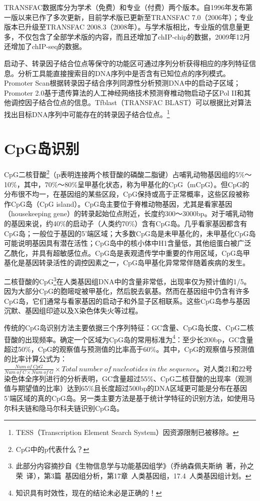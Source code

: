 \documentclass[11pt,a4paper,twoside]{book}
\begin{document}
TRANSFAC数据库分为学术（免费）和专业（付费）两个版本。自1996年发布第一版以来已作了多次更新，目前学术版已更新至TRANSFAC 7.0（2006年）；专业版本已升级至TRANSFAC 2008.3（2008年）。与学术版相比，专业版的信息量更多，不仅包含了全部学术版的内容，而且还增加了chIP-chip的数据，2009年12月还增加了chIP-seq的数据。

启动子、转录因子结合位点等保守的功能区可通过序列分析获得相应的序列特征信息。分析工具能直接搜索目的DNA序列中是否含有已知位点的序列模式。Promoter Scan根据转录因子结合序列同源性分析预测DNA中的启动子区域；Promoter 2.0基于遗传算法的人工神经网络技术预测脊椎动物启动子区Pol II和其他调控因子结合位点的信息。Tfblast（TRANSFAC BLAST）可以根据比对算法找出目标DNA序列中可能存在的转录因子结合位点。\footnote{TESS（Transcription Element Search System）因资源限制已被移除。}

\section{CpG岛识别}
CpG二核苷酸\footnote{CpG中的p代表什么？}（p表明连接两个核苷酸的磷酸二脂键）占哺乳动物基因组的5\%～10\%，其中，70\%～80\%呈甲基化状态，称为甲基化的CpG（mCpG）。但CpG的分布很不均一，在基因组的某些区段，CpG保持或高于正常概率，这些区段被称作CpG岛（CpG island）。CpG岛主要位于脊椎动物基因，尤其是看家基因（housekeeping gene）的转录起始位点附近，长度约300～3000bp。对于哺乳动物的基因来说，约40\%的启动子（人类约70\%）含有CpG岛。几乎看家基因都含有CpG岛；一般位于基因的5'端区域；大多数CpG岛是未甲基化的，未甲基化CpG岛可能说明基因具有潜在活性；CpG岛中的核小体中H1含量低，其他组蛋白被广泛乙酰化，并具有超敏感位点。CpG岛是表观遗传学中重要的作用区域，CpG岛甲基化是基因转录活性的调控因素之一，CpG岛甲基化异常常伴随着疾病的发生。

二核苷酸的CpG\footnote{此部分内容摘抄自《生物信息学与功能基因组学》（乔纳森\textbullet 佩夫斯纳\ 著，孙之荣\ 译），第3篇\ 基因组分析，第17章\ 人类基因组，17.4\ 人类基因组计划。}在人类基因组DNA中的含量非常低，出现率仅为预计值的1/5。因为大部分CpG的胞嘧啶被甲基化，然后脱去氨基。然而在基因组中仍含有许多CpG岛，它们通常与看家基因的启动子和外显子区相联系。这些CpG岛参与基因沉默、基因组印迹以及X染色体失火等过程。

传统的CpG岛识别方法主要依据三个序列特征：GC含量、CpG岛长度、CpG二核苷酸的出现频率。确定一个区域为CpG岛的常用标准为\footnote{知识具有时效性，现在的结论未必是正确的！}：至少长200bp，GC含量超过50\%，CpG的观察值与预测值的比率高于60\%。其中，CpG的观察值与预测值的比率计算公式为：$\frac{Num\ of\ CpG}{Num\ of\ C \times Num\ of\ G} \times Total\ number\ of\ nucleotides\ in\ the\ sequence$。对人类21和22号染色体全序列进行的分析表明，GC含量超过55\%、CpG二核苷酸的出现率（观测值与期望值的比率）达到65\%且长度超过500bp的DNA区域更可能是分布在基因5'端区域的真的CpG岛。另一类主要方法是基于统计学特征的识别方法，如使用马尔科夫链和隐马尔科夫链识别CpG岛。
\end{document}
